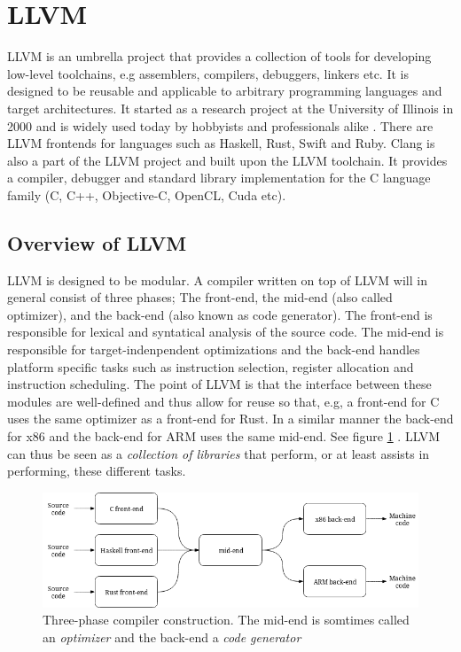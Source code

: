 \section{LLVM}
LLVM is an umbrella project that provides a collection of tools for developing low-level
toolchains, e.g assemblers, compilers, debuggers, linkers etc. It is designed to be reusable and
applicable to arbitrary programming languages and target architectures. It started as a
research project at the University of Illinois in 2000 and is widely used today by hobbyists
and professionals alike \cite{llvm-overview}. There are LLVM frontends for languages such
as Haskell\cite{ghc-backend}, Rust\cite{rust-llvm}, Swift\cite{swift-llvm} and Ruby\cite{rubymotion}. Clang is also a part
of the LLVM project and built upon the LLVM toolchain. It provides a compiler, debugger
and standard library implementation for the C language family (C, C++, Objective-C,
OpenCL, Cuda etc)\cite{clang}.

\subsection{Overview of LLVM}

LLVM is designed to be modular. A compiler written on top of LLVM will in general consist
of three phases; The front-end, the mid-end (also called optimizer), and the back-end
(also known as code generator). The front-end is responsible for lexical and syntatical
analysis of the source code. The mid-end is responsible for target-indenpendent optimizations
and the back-end handles platform specific tasks such as instruction selection, register
allocation and instruction scheduling\cite[Section~11.1]{aosa-llvm}. The point of LLVM is
that the interface between these modules are well-defined and thus allow for reuse so
that, e.g, a front-end for C uses the same optimizer as a front-end for Rust. In a similar
manner the back-end for x86 and the back-end for ARM uses the same mid-end. See figure
\ref{fig:three_phase_compiler} \cite[Section~11.4]{aosa-llvm}. LLVM can thus be seen as a \textit{collection of libraries}
\cite[Section~11.4.2]{aosa-llvm} that perform, or at least assists in performing, these different tasks.

\begin{figure}[h]
	\centering
	\includegraphics[width=12cm]{background/llvm/figures/three_phase_compiler}
	\caption{Three-phase compiler construction. The mid-end is somtimes called an \textit{optimizer}
	and the back-end a \textit{code generator}}
	\label{fig:three_phase_compiler}
\end{figure}

